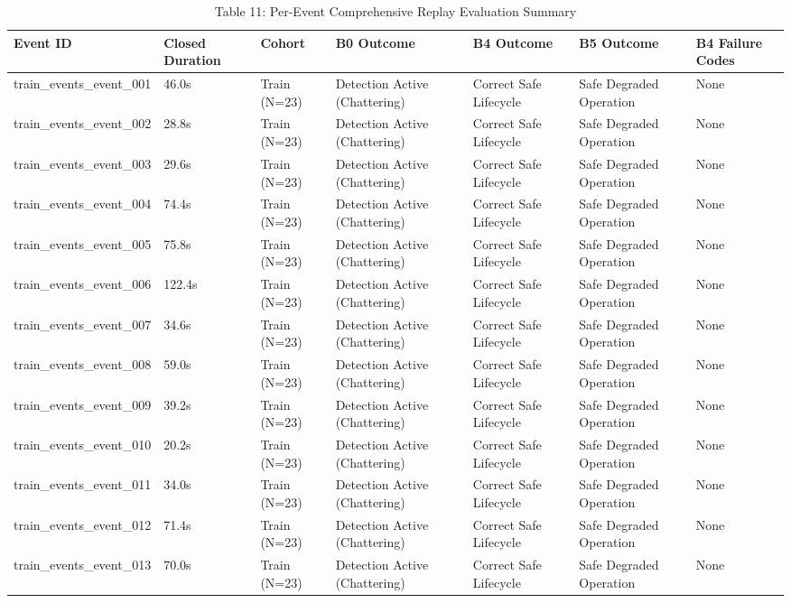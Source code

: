 \begin{table}[t]
\centering
\caption{Table 11: Per-Event Comprehensive Replay Evaluation Summary}
\label{tab:table11_per_event_summary}
\begin{tabular}{lllllll}
\hline
Event ID & Closed Duration & Cohort & B0 Outcome & B4 Outcome & B5 Outcome & B4 Failure Codes \\
\hline
train\_events\_event\_001 & 46.0s & Train (N=23) & Detection Active (Chattering) & Correct Safe Lifecycle & Safe Degraded Operation & None \\
train\_events\_event\_002 & 28.8s & Train (N=23) & Detection Active (Chattering) & Correct Safe Lifecycle & Safe Degraded Operation & None \\
train\_events\_event\_003 & 29.6s & Train (N=23) & Detection Active (Chattering) & Correct Safe Lifecycle & Safe Degraded Operation & None \\
train\_events\_event\_004 & 74.4s & Train (N=23) & Detection Active (Chattering) & Correct Safe Lifecycle & Safe Degraded Operation & None \\
train\_events\_event\_005 & 75.8s & Train (N=23) & Detection Active (Chattering) & Correct Safe Lifecycle & Safe Degraded Operation & None \\
train\_events\_event\_006 & 122.4s & Train (N=23) & Detection Active (Chattering) & Correct Safe Lifecycle & Safe Degraded Operation & None \\
train\_events\_event\_007 & 34.6s & Train (N=23) & Detection Active (Chattering) & Correct Safe Lifecycle & Safe Degraded Operation & None \\
train\_events\_event\_008 & 59.0s & Train (N=23) & Detection Active (Chattering) & Correct Safe Lifecycle & Safe Degraded Operation & None \\
train\_events\_event\_009 & 39.2s & Train (N=23) & Detection Active (Chattering) & Correct Safe Lifecycle & Safe Degraded Operation & None \\
train\_events\_event\_010 & 20.2s & Train (N=23) & Detection Active (Chattering) & Correct Safe Lifecycle & Safe Degraded Operation & None \\
train\_events\_event\_011 & 34.0s & Train (N=23) & Detection Active (Chattering) & Correct Safe Lifecycle & Safe Degraded Operation & None \\
train\_events\_event\_012 & 71.4s & Train (N=23) & Detection Active (Chattering) & Correct Safe Lifecycle & Safe Degraded Operation & None \\
train\_events\_event\_013 & 70.0s & Train (N=23) & Detection Active (Chattering) & Correct Safe Lifecycle & Safe Degraded Operation & None \\

\end{tabular}
\end{table}
